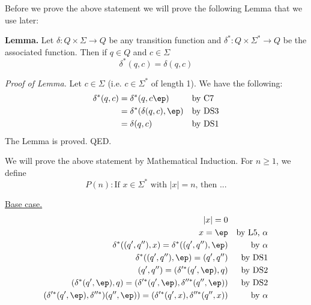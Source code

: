 Before we prove the above statement we will prove the following Lemma that we 
use later:

{\bf Lemma.}
Let $\delta: Q \times \Sigma \rightarrow Q$ be any transition function and 
$\delta^*: Q \times \Sigma^* \rightarrow Q$ be the associated function.
Then if $q \in Q$ and $c \in \Sigma$ 
\[
\delta^*(q, c) = \delta(q, c)
\]


{\it Proof of Lemma.} 
Let $c \in \Sigma$ (i.e. $c \in \Sigma^*$ of length 1).
We have the following:
\begin{align*}
\delta^*(q, c)
&= \delta^*(q, c\ep)           & & \text{by C7}\\
&= \delta^*(\delta(q,c), \ep)            & & \text{by DS3} \\
&= \delta(q, c)                & & \text{by DS1}
\end{align*}
The Lemma is proved.
QED.


We will prove the above statement by Mathematical Induction.
For $n \geq 1$, we define
\[
P(n):
\text{
If $x\in \Sigma^*$ with $|x| =n$, then ...
}
\]

\underline{Base case.}
\begin{align*}
|x| = 0                                                     & & \\
x = \ep                                                     & & \text{by L5, $\alpha$}\\
\delta^*((q',q''),x)=\delta^*((q',q''),\ep)& & \text{by $\alpha$} \\
\delta^*((q',q''),\ep)=(q',q'')                             & & \text{by DS1}\\
(q',q'')=(\delta'^*(q',\ep),q)                              & & \text{by DS2}\\
(\delta^*(q',\ep),q)=(\delta'^*(q',\ep),\delta''^*(q'',\ep))& & \text{by DS2}\\
(\delta'^*(q',\ep),\delta''^*)(q'',\ep))=(\delta'^*(q',x),\delta''^*(q'',x))                                                & & \text{by $\alpha$}
\end{align*}



